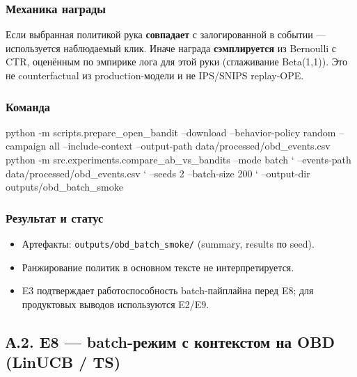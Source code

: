 \subsubsection{Механика награды}\label{ux43cux435ux445ux430ux43dux438ux43aux430-ux43dux430ux433ux440ux430ux434ux44b}

Если выбранная политикой рука \textbf{совпадает} с залогированной в событии --- используется наблюдаемый клик. Иначе награда \textbf{сэмплируется} из Bernoulli с CTR, оценённым по эмпирике лога для этой руки (сглаживание Beta(1,1)). Это не counterfactual из production-модели и не IPS/SNIPS replay-OPE.

\subsubsection{Команда}\label{ux43aux43eux43cux430ux43dux434ux430}

\begin{pythoncode}
python -m scripts.prepare_open_bandit --download --behavior-policy random --campaign all --include-context --output-path data/processed/obd_events.csv
python -m src.experiments.compare_ab_vs_bandits --mode batch `
  --events-path data/processed/obd_events.csv `
  --seeds 2 --batch-size 200 `
  --output-dir outputs/obd_batch_smoke
\end{pythoncode}


\subsubsection{Результат и статус}\label{ux440ux435ux437ux443ux43bux44cux442ux430ux442-ux438-ux441ux442ux430ux442ux443ux441}

\begin{itemize}
\tightlist
\item
  Артефакты: \texttt{outputs/obd\_batch\_smoke/} (summary, results по seed).
\item
  Ранжирование политик в основном тексте не интерпретируется.
\item
  E3 подтверждает работоспособность batch-пайплайна перед E8; для продуктовых выводов используются E2/E9.
\end{itemize}

\subsection*{А.2. E8 --- batch-режим с контекстом на OBD (LinUCB / TS)}\label{ux430.2.-e8-batch-ux440ux435ux436ux438ux43c-ux441-ux43aux43eux43dux442ux435ux43aux441ux442ux43eux43c-ux43dux430-obd-linucb-ts}

